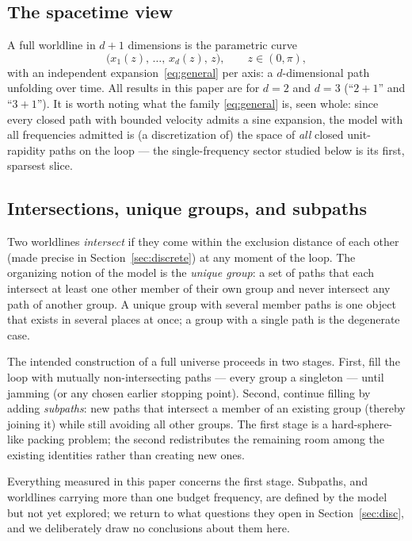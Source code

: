 \documentclass[11pt]{article}
\begin{document}
\subsection{The spacetime view}

A full worldline in $d{+}1$ dimensions is the parametric curve
\begin{equation*}
  \bigl(x_1(z),\, \ldots,\, x_d(z),\, z\bigr), \qquad z \in (0,\pi),
\end{equation*}
with an independent expansion~\eqref{eq:general} per axis: a $d$-dimensional
path unfolding over time. All results in this paper are for $d = 2$ and
$d = 3$ (``$2{+}1$'' and ``$3{+}1$''). It is worth noting what the family
\eqref{eq:general} is, seen whole: since every closed path with bounded
velocity admits a sine expansion, the model with all frequencies admitted is
(a discretization of) the space of \emph{all} closed unit-rapidity paths on
the loop --- the single-frequency sector studied below is its first, sparsest
slice.

\subsection{Intersections, unique groups, and subpaths}
\label{sec:groups}

Two worldlines \emph{intersect} if they come within the exclusion distance of
each other (made precise in Section~\ref{sec:discrete}) at any moment of the
loop. The organizing notion of the model is the \emph{unique group}: a set of
paths that each intersect at least one other member of their own group and
never intersect any path of another group. A unique group with several member
paths is one object that exists in several places at once; a group with a
single path is the degenerate case.

The intended construction of a full universe proceeds in two stages. First,
fill the loop with mutually non-intersecting paths --- every group a
singleton --- until jamming (or any chosen earlier stopping point). Second,
continue filling by adding \emph{subpaths}: new paths that intersect a member
of an existing group (thereby joining it) while still avoiding all other
groups. The first stage is a hard-sphere-like packing problem; the second
redistributes the remaining room among the existing identities rather than
creating new ones.

Everything measured in this paper concerns the first stage. Subpaths, and
worldlines carrying more than one budget frequency, are defined by the model
but not yet explored; we return to what questions they open in
Section~\ref{sec:disc}, and we deliberately draw no conclusions about them
here.
\end{document}
